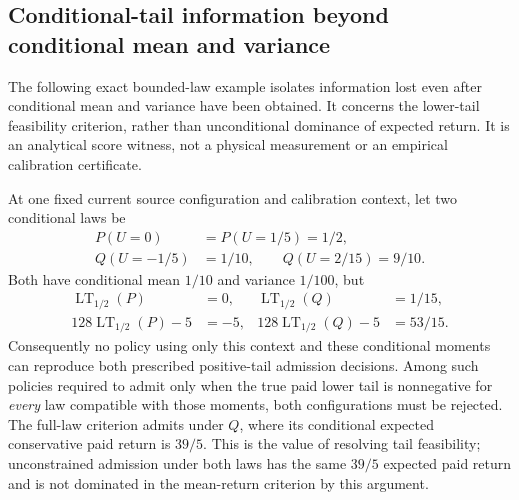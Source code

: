 \subsection{Conditional-tail information beyond conditional mean and variance}
\label{app:conditional-tail-information}
The following exact bounded-law example isolates information lost even
after conditional mean and variance have been obtained. It concerns the
lower-tail feasibility criterion, rather than unconditional dominance of
expected return. It is an analytical score witness, not a physical
measurement or an empirical calibration certificate.

\begin{proposition}
\label{prop:conditional-tail-information}
At one fixed current source configuration and calibration context, let
two conditional laws be
\begin{equation}
 \begin{aligned}
 P(U=0)&=P(U=1/5)=1/2,\\
 Q(U=-1/5)&=1/10,\qquad Q(U=2/15)=9/10.
 \end{aligned}
 \label{eq:conditional-tail-witness-laws}
\end{equation}
Both have conditional mean $1/10$ and variance $1/100$, but
\begin{equation}
 \begin{aligned}
 \operatorname{LT}_{1/2}(P)&=0,&
 \operatorname{LT}_{1/2}(Q)&=1/15,\\
 128\operatorname{LT}_{1/2}(P)-5&=-5,&
 128\operatorname{LT}_{1/2}(Q)-5&=53/15.
 \end{aligned}
 \label{eq:conditional-tail-witness-actions}
\end{equation}
Consequently no policy using only this context and these conditional
moments can reproduce both prescribed positive-tail admission decisions.
Among such policies required to admit only when the true paid lower tail
is nonnegative for \emph{every} law compatible with those moments,
both configurations must be rejected. The full-law criterion admits under
$Q$, where its conditional expected conservative paid return is $39/5$.
This is the value of resolving tail feasibility; unconstrained admission
under both laws has the same $39/5$ expected paid return and is not
dominated in the mean-return criterion by this argument.
\end{proposition}
